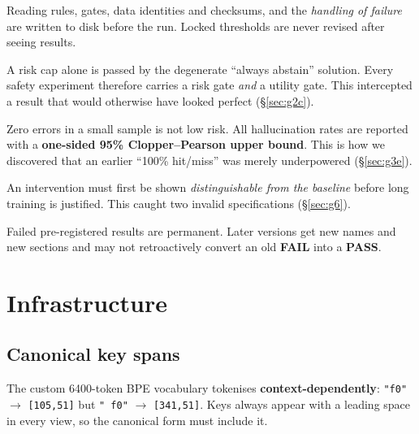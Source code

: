 \documentclass[11pt, a4paper]{article}
\newcommand{\PASS}{\textcolor{green!45!black}{\textbf{PASS}}}
\newcommand{\FAIL}{\textcolor{red!70!black}{\textbf{FAIL}}}
\begin{document}
\begin{description}[leftmargin=1.4em, style=nextline]
\item[Pre-registration.] Reading rules, gates, data identities and checksums, and the
\emph{handling of failure} are written to disk before the run. Locked thresholds are
never revised after seeing results.

\item[Utility gates.] A risk cap alone is passed by the degenerate ``always abstain''
solution. Every safety experiment therefore carries a risk gate \emph{and} a utility
gate. This intercepted a result that would otherwise have looked perfect
(\S\ref{sec:g2c}).

\item[Bounds, not point estimates.] Zero errors in a small sample is not low risk. All
hallucination rates are reported with a \textbf{one-sided 95\% Clopper--Pearson upper
bound}. This is how we discovered that an earlier ``100\% hit/miss'' was merely
underpowered (\S\ref{sec:g3e}).

\item[Identifiability gates.] An intervention must first be shown \emph{distinguishable
from the baseline} before long training is justified. This caught two invalid
specifications (\S\ref{sec:g6}).

\item[Never backfill a milestone.] Failed pre-registered results are permanent. Later
versions get new names and new sections and may not retroactively convert an old
\FAIL{} into a \PASS{}.
\end{description}

\section{Infrastructure}

\subsection{Canonical key spans}

The custom 6400-token BPE vocabulary tokenises \textbf{context-dependently}:
\verb|"f0"| $\to$ \verb|[105,51]| but \verb|" f0"| $\to$ \verb|[341,51]|. Keys always
appear with a leading space in every view, so the canonical form must include it.
\end{document}
